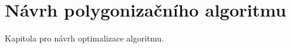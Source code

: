 \chapter{Návrh polygonizačního algoritmu}
\label{chap:navrhpolygonizacnihoalgoritmu}
	Kapitola pro návrh optimalizace algoritmu.

	

